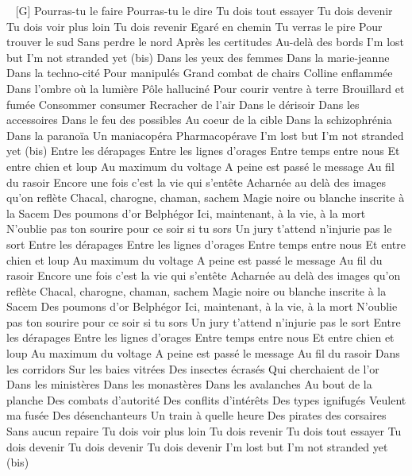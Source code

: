 \begin{guitar}
[A-]
 ~ [G]
 Pourras-tu le faire
Pourras-tu le dire
Tu dois tout essayer
Tu dois devenir
Tu dois voir plus loin
Tu dois revenir
Egaré en chemin
Tu verras le pire
Pour trouver le sud
Sans perdre le nord
Après les certitudes
Au-delà des bords
I'm lost but I'm not stranded yet (bis)
Dans les yeux des femmes
Dans la marie-jeanne
Dans la techno-cité
Pour manipulés
Grand combat de chairs
Colline enflammée
Dans l'ombre où la lumière
Pôle halluciné
Pour courir ventre à terre
Brouillard et fumée
Consommer consumer
Recracher de l'air
Dans le dérisoir
Dans les accessoires
Dans le feu des possibles
Au coeur de la cible
Dans la schizophrénia
Dans la paranoïa
Un maniacopéra
Pharmacopérave
I'm lost but I'm not stranded yet (bis)
Entre les dérapages
Entre les lignes d'orages
Entre temps entre nous
Et entre chien et loup
Au maximum du voltage
A peine est passé le message
Au fil du rasoir
Encore une fois c'est la vie qui s'entête
Acharnée au delà des images qu'on reflète
Chacal, charogne, chaman, sachem
Magie noire ou blanche inscrite à la Sacem
Des poumons d'or
Belphégor
Ici, maintenant, à la vie, à la mort
N'oublie pas ton sourire pour ce soir si tu sors
Un jury t'attend n'injurie pas le sort
Entre les dérapages
Entre les lignes d'orages
Entre temps entre nous
Et entre chien et loup
Au maximum du voltage
A peine est passé le message
Au fil du rasoir
Encore une fois c'est la vie qui s'entête
Acharnée au delà des images qu'on reflète
Chacal, charogne, chaman, sachem
Magie noire ou blanche inscrite à la Sacem
Des poumons d'or
Belphégor
Ici, maintenant, à la vie, à la mort
N'oublie pas ton sourire pour ce soir si tu sors
Un jury t'attend n'injurie pas le sort
Entre les dérapages
Entre les lignes d'orages
Entre temps entre nous
Et entre chien et loup
Au maximum du voltage
A peine est passé le message
Au fil du rasoir
Dans les corridors
Sur les baies vitrées
Des insectes écrasés
Qui cherchaient de l'or
Dans les ministères
Dans les monastères
Dans les avalanches
Au bout de la planche
Des combats d'autorité
Des conflits d'intérêts
Des types ignifugés
Veulent ma fusée
Des désenchanteurs
Un train à quelle heure
Des pirates des corsaires
Sans aucun repaire
Tu dois voir plus loin
Tu dois revenir
Tu dois tout essayer
Tu dois devenir
Tu dois devenir
Tu dois devenir
I'm lost but I'm not stranded yet (bis)

\end{guitar}